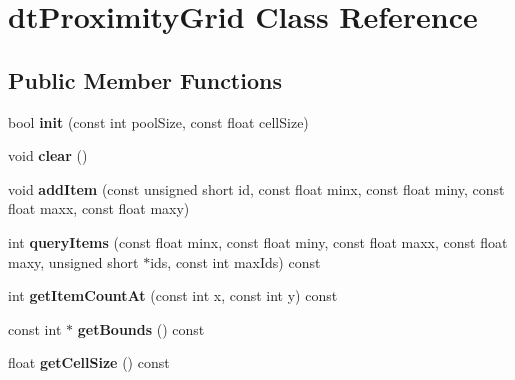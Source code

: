 \hypertarget{classdtProximityGrid}{}\section{dt\+Proximity\+Grid Class Reference}
\label{classdtProximityGrid}
\subsection*{Public Member Functions}
\begin{DoxyCompactItemize}
\item 
\mbox{\label{classdtProximityGrid_aef4e5c3fa11d5ba99a33dfadbea198d3}} 
bool {\bfseries init} (const int pool\+Size, const float cell\+Size)
\item 
\mbox{\label{classdtProximityGrid_abfbfdb91797c4414d1201d761d9c1a94}} 
void {\bfseries clear} ()
\item 
\mbox{\label{classdtProximityGrid_ad19f5adb495c35e386c6e1ba314a2b59}} 
void {\bfseries add\+Item} (const unsigned short id, const float minx, const float miny, const float maxx, const float maxy)
\item 
\mbox{\label{classdtProximityGrid_a4ee1269c36500bb20d3891a2363c5ea8}} 
int {\bfseries query\+Items} (const float minx, const float miny, const float maxx, const float maxy, unsigned short $\ast$ids, const int max\+Ids) const
\item 
\mbox{\label{classdtProximityGrid_ac788d2fbab7612826abeeab20a4f94fb}} 
int {\bfseries get\+Item\+Count\+At} (const int x, const int y) const
\item 
\mbox{\label{classdtProximityGrid_a9850e14d04f7d60909c46bec50c5ef65}} 
const int $\ast$ {\bfseries get\+Bounds} () const
\item 
\mbox{\label{classdtProximityGrid_aca646eb6926a096bb8062e7bf3a09945}} 
float {\bfseries get\+Cell\+Size} () const
\item 
\mbox{\label{classdtProximityGrid_aef4e5c3fa11d5ba99a33dfadbea198d3}} 

\end{DoxyCompactItemize}
